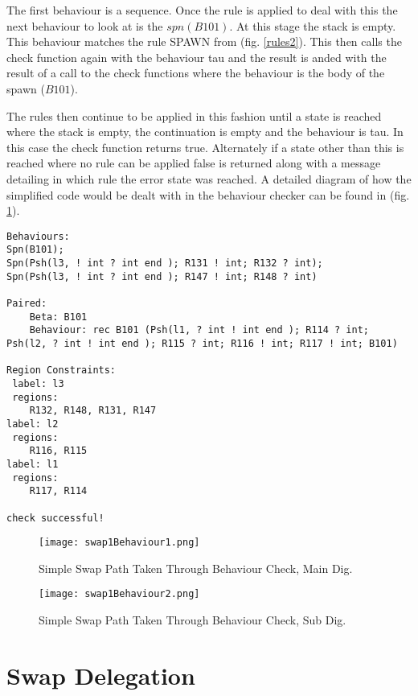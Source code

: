 The first behaviour is a sequence. Once the rule is applied to deal with this the next behaviour to look at is the $spn(B101)$. At this stage the stack is empty. This behaviour matches the rule SPAWN from (fig. \ref{rules2}). This then calls the check function again with the behaviour tau and the result is anded with the result of a call to the check functions where the behaviour is the body of the spawn ($B101$). 

The rules then continue to be applied in this fashion until a state is reached where the stack is empty, the continuation is empty and the behaviour is tau. In this case the check function returns true. Alternately if a state other than this is reached where no rule can be applied false is returned along with a message detailing in which rule the error state was reached. A detailed diagram of how the simplified code would be dealt with in the behaviour checker can be found in (fig. \ref{path}).

\begin{lstlisting}
Behaviours:
Spn(B101);
Spn(Psh(l3, ! int ? int end ); R131 ! int; R132 ? int);
Spn(Psh(l3, ! int ? int end ); R147 ! int; R148 ? int)

Paired: 
	Beta: B101 
	Behaviour: rec B101 (Psh(l1, ? int ! int end ); R114 ? int; Psh(l2, ? int ! int end ); R115 ? int; R116 ! int; R117 ! int; B101)

Region Constraints:
 label: l3
 regions:
	R132, R148, R131, R147
label: l2
 regions:
	R116, R115
label: l1
 regions:
	R117, R114

check successful!
\end{lstlisting}

\begin{figure}
\texttt{[image: swap1Behaviour1.png]}
\caption{Simple Swap Path Taken Through Behaviour Check, Main Dig.}
\label{path}
\end{figure}

\begin{figure}
\texttt{[image: swap1Behaviour2.png]}
\caption{Simple Swap Path Taken Through Behaviour Check, Sub Dig.}
\label{path2}
\end{figure}

\FloatBarrier
\section{Swap Delegation}

